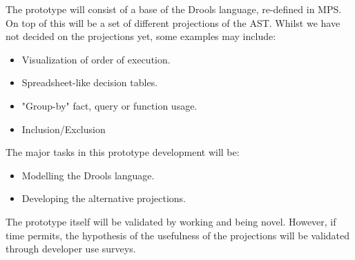 The prototype will consist of a base of the Drools language, re-defined in MPS.  
On top of this will be a set of different projections of the AST.
Whilst we have not decided on the projections yet, some examples may include:
\begin{itemize}
    \item Visualization of order of execution.
    \item Spreadsheet-like decision tables.
    \item "Group-by" fact, query or function usage.
    \item Inclusion/Exclusion
\end{itemize}


The major tasks in this prototype development will be: 
\begin{itemize}
    \item Modelling the Drools language.
    \item Developing the alternative projections.
\end{itemize}

The prototype itself will be validated by working and being novel.
However, if time permits, the hypothesis of the usefulness of the projections will be validated through developer use surveys.

